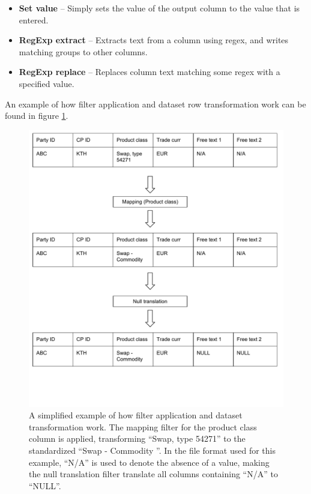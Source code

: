 \begin{itemize}
\item \textbf{Set value} --
Simply sets the value of the output column to the value that is entered.

\item \textbf{RegExp extract} --
Extracts text from a column using regex, and writes matching groups to other columns.

\item \textbf{RegExp replace} --
Replaces column text matching some regex with a specified value.

\end{itemize}

An example of how filter application and dataset row transformation work can be found in figure \ref{fig:filter_diagram}.

\begin{figure}[ht]
  \centering
  \includegraphics[width=120mm]{figures/filter_diagram.pdf}
  \caption[Filter application example.]{A simplified example of how filter application and dataset transformation work. The mapping filter for the
  product class column is applied, transforming ``Swap, type 54271'' to the standardized ``Swap - Commodity ''. In the file format used for this example,
  ``N/A'' is used to denote the absence of a value, making the null translation filter translate all columns containing ``N/A'' to ``NULL''.}
  \label{fig:filter_diagram}
\end{figure}

